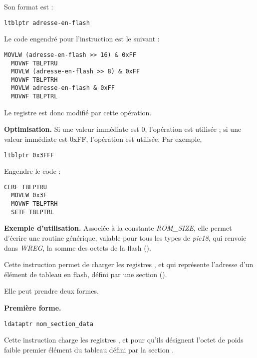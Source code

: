 Son format est :
\begin{lstlisting}[language=piccolo]
  ltblptr adresse-en-flash
\end{lstlisting}

Le code engendré pour l'instruction est le suivant :
\begin{lstlisting}[language=assembleur]
  MOVLW (adresse-en-flash >> 16) & 0xFF
  MOVWF TBLPTRU
  MOVLW (adresse-en-flash >> 8) & 0xFF
  MOVWF TBLPTRH
  MOVLW adresse-en-flash & 0xFF
  MOVWF TBLPTRL
\end{lstlisting}

Le registre  est donc modifié par cette opération.

\textbf{Optimisation.} Si une valeur immédiate est 0, l'opération  est utilisée ; si une valeur immédiate est 0xFF, l'opération  est utilisée. Par exemple, 
\begin{lstlisting}[language=piccolo]
  ltblptr 0x3FFF
\end{lstlisting}

Engendre le code :
\begin{lstlisting}[language=assembleur]
  CLRF TBLPTRU
  MOVLW 0x3F
  MOVWF TBLPTRH
  SETF TBLPTRL
\end{lstlisting}


\textbf{Exemple d'utilisation.} Associée à la constante \emph{ROM\_SIZE}, elle permet d'écrire une routine générique, valable pour tous les types de \emph{pic18}, qui renvoie dans \emph{WREG}, la somme des octets de la flash ().



Cette instruction permet de charger les registres ,  et  qui représente l'adresse d'un élément de tableau en flash, défini par une section  ().

Elle peut prendre deux formes.

\textbf{Première forme.}

\begin{lstlisting}[language=piccolo]
  ldataptr nom_section_data
\end{lstlisting}

Cette instruction charge les registres ,  et  pour qu'ils désignent l'octet de poids faible premier élément du tableau défini par la section .

